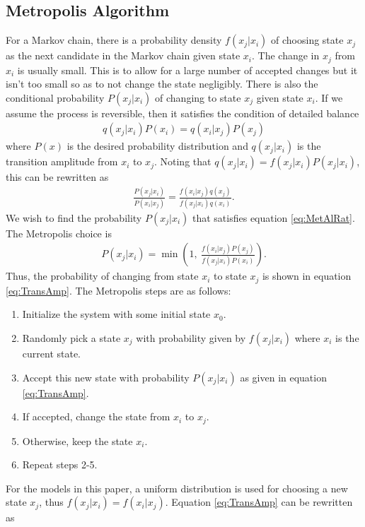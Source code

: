 \documentclass[11pt]{article}
\begin{document}
\subsection{Metropolis Algorithm}
For a Markov chain, there is a probability density $f(x_j|x_i)$ of choosing state $x_j$ as the next candidate in the Markov chain given state $x_i$. The change in $x_j$ from $x_i$ is usually small. This is to allow for a large number of accepted changes but it isn't too small so as to not change the state negligibly. There is also the conditional probability $P(x_j|x_i)$ of changing to state $x_j$ given state $x_i$. If we assume the process is reversible, then it satisfies the condition of detailed balance
\begin{align}
	q(x_j|x_i)P(x_i)=q(x_i|x_j)P(x_j)
\end{align}
where $P(x)$ is the desired probability distribution and $q(x_j|x_i)$ is the transition amplitude from $x_i$ to $x_j$. Noting that $q(x_j|x_i)=f(x_j|x_i)P(x_j|x_i)$, this can be rewritten as
\begin{align}
	\frac{P(x_j|x_i)}{P(x_i|x_j)}=\frac{f(x_i|x_j)q(x_j)}{f(x_j|x_i)q(x_i)}.
	\label{eq:MetAlRat}
\end{align}
We wish to find the probability $P(x_j|x_i)$ that satisfies equation \ref{eq:MetAlRat}. The Metropolis choice is
\begin{align}
	P(x_j|x_i)=\min\left(1,\ \frac{f(x_i|x_j)P(x_j)}{f(x_j|x_i)P(x_i)}\right).
	\label{eq:TransAmp}
\end{align}
Thus, the probability of changing from state $x_i$ to state $x_j$ is shown in equation \ref{eq:TransAmp}. The Metropolis steps are as follows:
\begin{enumerate}
\item Initialize the system with some initial state $x_0$.
\item Randomly pick a state $x_j$ with probability given by $f(x_j|x_i)$ where $x_i$ is the current state.
\item Accept this new state with probability $P(x_j|x_i)$ as given in equation \ref{eq:TransAmp}.
\item If accepted, change the state from $x_i$ to $x_j$.
\item Otherwise, keep the state $x_i$.
\item Repeat steps 2-5.
\end{enumerate}
For the models in this paper, a uniform distribution is used for choosing a new state $x_j$, thus $f(x_j|x_i)=f(x_i|x_j)$. Equation \ref{eq:TransAmp} can be rewritten as
\end{document}
